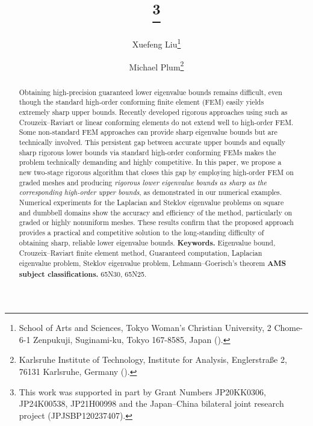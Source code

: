 \documentclass[a4,11pt]{article}
\title{{\TheTitle}\thanks{%
This work was supported in part by Grant Numbers JP20KK0306, JP24K00538, JP21H00998 and the Japan–China bilateral joint research project (JPJSBP120237407).%
}}
\author{%
Xuefeng Liu\thanks{School of Arts and Sciences, Tokyo Woman's Christian University,
2 Chome-6-1 Zenpukuji, Suginami-ku, Tokyo 167-8585, Japan
(\email{xfliu@lab.twcu.ac.jp}).}
\and
Michael Plum\thanks{Karlsruhe Institute of Technology, Institute for Analysis, Englerstra{\ss}e 2, 76131 Karlsruhe, Germany
(\email{michael.plum@kit.edu}).}
}
\numberwithin{equation}{section}
\begin{document}

\date{}
\maketitle
\begin{abstract}

Obtaining high-precision guaranteed lower eigenvalue bounds remains difficult, even though the standard high-order conforming finite element (FEM) easily yields extremely sharp upper bounds. Recently developed rigorous  approaches using such as Crouzeix–Raviart or linear conforming elements do not extend well to high-order FEM. Some non-standard FEM approaches can provide sharp eigenvalue bounds but are technically involved. This persistent gap between accurate upper bounds and equally sharp rigorous lower bounds via standard high-order conforming FEMs makes the problem technically demanding and highly competitive. In this paper, we propose a new two-stage rigorous algorithm that closes this gap by employing high-order FEM on graded meshes and producing {\em rigorous lower eigenvalue bounds as sharp as the corresponding high-order upper bounds}, as demonstrated in our numerical examples. Numerical experiments for the Laplacian and Steklov eigenvalue problems on square and dumbbell domains show the accuracy and efficiency of the method, particularly on graded or highly nonuniform meshes. These results confirm that the proposed approach provides a practical and competitive solution to the long-standing difficulty of obtaining sharp, reliable lower eigenvalue bounds.
\vskip0.3cm {\bf Keywords.}  Eigenvalue bound,
Crouzeix--Raviart finite element method,  Guaranteed computation, Laplacian eigenvalue problem, Steklov eigenvalue problem, Lehmann--Goerisch's theorem
\vskip0.2cm {\bf AMS subject classifications.} 65N30, 65N25.
\end{abstract}
\end{document}
